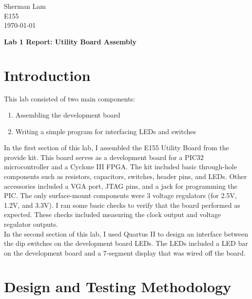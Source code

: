 \documentclass[11pt]{article}
\begin{document}
\begin{flushleft}
Sherman Lam
\\E155
\\ \today
\end{flushleft}


\begin{center}
\begin{Large}
\textbf{Lab 1 Report: Utility Board Assembly}
\end{Large}
\end{center}




\section{Introduction}
\label{sec:intro}

This lab consisted of two main components: 
	\begin{enumerate} \itemsep0pt
		\item Assembling the development board
		\item Writing a simple program for interfacing LEDs and switches
	\end{enumerate}

In the first section of this lab, I assembled the E155 Utility Board from the provide kit. This board serves as a development board for a PIC32 microcontroller and a Cyclone III FPGA. The kit included basic through-hole components such as resistors, capacitors, switches, header pins, and LEDs. Other accessories included a VGA port, JTAG pins, and a jack for programming the PIC. The only surface-mount components were 3 voltage regulators (for 2.5V, 1.2V, and 3.3V). I ran some basic checks to verify that the board performed as expected. These checks included measuring the clock output and voltage regulator outputs.\\

In the second section of this lab, I used Quartus II to design an interface between the dip switches on the development board LEDs. The LEDs included a LED bar on the development board and a 7-segment display that was wired off the board.


\section{Design and Testing Methodology}
\end{document}
